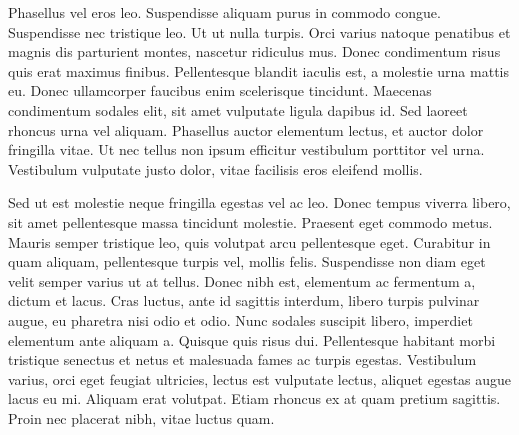 Phasellus vel eros leo. Suspendisse aliquam purus in commodo congue. Suspendisse nec tristique leo. Ut ut nulla turpis. Orci varius natoque penatibus et magnis dis parturient montes, nascetur ridiculus mus. Donec condimentum risus quis erat maximus finibus. Pellentesque blandit iaculis est, a molestie urna mattis eu. Donec ullamcorper faucibus enim scelerisque tincidunt. Maecenas condimentum sodales elit, sit amet vulputate ligula dapibus id. Sed laoreet rhoncus urna vel aliquam. Phasellus auctor elementum lectus, et auctor dolor fringilla vitae. Ut nec tellus non ipsum efficitur vestibulum porttitor vel urna. Vestibulum vulputate justo dolor, vitae facilisis eros eleifend mollis.

Sed ut est molestie neque fringilla egestas vel ac leo. Donec tempus viverra libero, sit amet pellentesque massa tincidunt molestie. Praesent eget commodo metus. Mauris semper tristique leo, quis volutpat arcu pellentesque eget. Curabitur in quam aliquam, pellentesque turpis vel, mollis felis. Suspendisse non diam eget velit semper varius ut at tellus. Donec nibh est, elementum ac fermentum a, dictum et lacus. Cras luctus, ante id sagittis interdum, libero turpis pulvinar augue, eu pharetra nisi odio et odio. Nunc sodales suscipit libero, imperdiet elementum ante aliquam a. Quisque quis risus dui. Pellentesque habitant morbi tristique senectus et netus et malesuada fames ac turpis egestas. Vestibulum varius, orci eget feugiat ultricies, lectus est vulputate lectus, aliquet egestas augue lacus eu mi. Aliquam erat volutpat. Etiam rhoncus ex at quam pretium sagittis. Proin nec placerat nibh, vitae luctus quam.